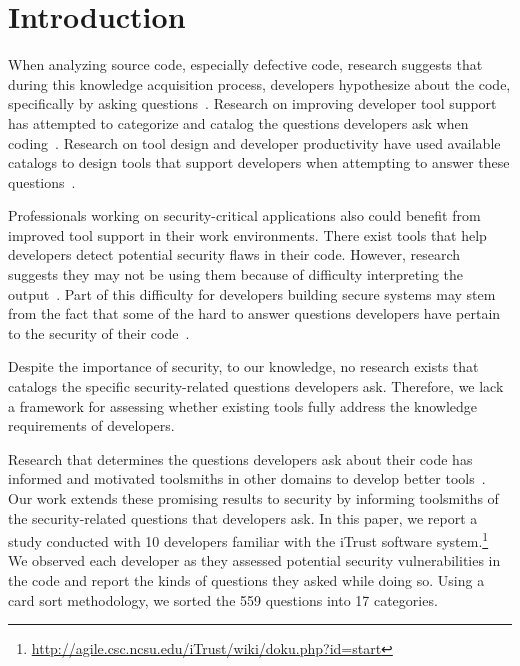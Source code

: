 \documentclass[conference]{IEEEtran}
\begin{document}
\section{Introduction}

When analyzing source code, especially defective code, research suggests that during this knowledge acquisition process, developers hypothesize about the code, specifically by asking questions~\cite{livshits2005finding, ko2004designing}. 
Research on improving developer tool support has attempted to categorize and catalog the questions developers ask when coding~\cite{latoza2010hard}. 
Research on tool design and developer productivity have used available catalogs to design tools that support developers when attempting to answer these questions~\cite{yoon2013visualization, servant2012history}.

 
Professionals working on security-critical applications also could benefit from improved tool support in their work environments. 
There exist tools that help developers detect potential security flaws in their code. 
However, research suggests they may not be using them because of difficulty interpreting the output~\cite{johnson2013don}. 
Part of this difficulty for developers building secure systems may stem from the fact that some of the hard to answer questions developers have pertain to the security of their code~\cite{latoza2010hard}.

Despite the importance of security, to our knowledge, no research exists that catalogs the specific security-related questions developers ask. 
Therefore, we lack a framework for assessing whether existing tools fully address the knowledge requirements of developers.

Research that determines the questions developers ask about their code has informed and motivated toolsmiths in other domains to develop better tools~\cite{kononenko2012automatically, servant2012history, yoon2013visualization}.
Our work extends these promising results to security by informing toolsmiths of the security-related questions that developers ask.
In this paper, we report a study conducted with 10 developers familiar with the iTrust software system.\footnote{\url{http://agile.csc.ncsu.edu/iTrust/wiki/doku.php?id=start}} 
We observed each developer as they assessed potential security vulnerabilities in the code and report the kinds of questions they asked while doing so. Using a card sort methodology, we sorted the 559 questions into 17 categories. 
\end{document}
